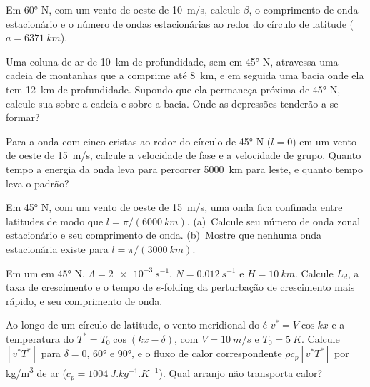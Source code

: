 \begin{exercise}[$\star$]\label{exo:b3:atmospheric-dynamics:4}
Em \ang{60} N, com um vento de oeste de \qty{10}{m/s}, calcule $\beta$, o
comprimento de onda estacionário e o número de ondas estacionárias ao redor do
círculo de latitude ($a = \qty{6371}{km}$).
\end{exercise}

\begin{exercise}[$\star\star$]\label{exo:b3:atmospheric-dynamics:5}
Uma coluna de ar de \qty{10}{km} de profundidade, sem  em \ang{45}
N, atravessa uma cadeia de montanhas que a comprime até \qty{8}{km}, e em seguida uma bacia
onde ela tem \qty{12}{km} de profundidade. Supondo que ela permaneça próxima de \ang{45} N, calcule sua
 sobre a cadeia e sobre a bacia. Onde
as depressões tenderão a se formar?
\end{exercise}

\begin{exercise}[$\star\star$]\label{exo:b3:atmospheric-dynamics:6}
Para a onda com cinco cristas ao redor do círculo de \ang{45} N ($l = 0$) em um
vento de oeste de \qty{15}{m/s}, calcule a velocidade de fase e a velocidade de grupo.
Quanto tempo a energia da onda leva para percorrer \qty{5000}{km} para leste, e quanto
tempo leva o padrão?
\end{exercise}

\begin{exercise}[$\star\star$]\label{exo:b3:atmospheric-dynamics:7}
Em \ang{45} N, com um vento de oeste de \qty{15}{m/s}, uma onda fica confinada entre
latitudes de modo que $l = \pi/(\qty{6000}{km})$. (a)~Calcule seu número de onda zonal estacionário e seu
comprimento de onda. (b)~Mostre que nenhuma onda estacionária existe para
$l = \pi/(\qty{3000}{km})$.
\end{exercise}

\begin{exercise}[$\star\star$]\label{exo:b3:atmospheric-dynamics:8}
Em um  em \ang{45} N, $\Lambda = \qty{2e-3}{s^{-1}}$, $N =
\qty{0.012}{s^{-1}}$ e $H = \qty{10}{km}$. Calcule $L_d$, a taxa de crescimento
e o tempo de $e$-folding da perturbação de crescimento mais rápido, e seu
comprimento de onda.
\end{exercise}

\begin{exercise}[$\star\star$]\label{exo:b3:atmospheric-dynamics:9}
Ao longo de um círculo de latitude, o vento meridional do  é $v^* = V\cos kx$ e a
temperatura do  $T^* = T_0\cos(kx - \delta)$, com $V = \qty{10}{m/s}$ e
$T_0 = \qty{5}{K}$. Calcule $[v^*T^*]$ para $\delta = 0$, \ang{60} e
\ang{90}, e o fluxo de calor correspondente $\rho c_p[v^*T^*]$ por
\unit{kg/m^3} de ar ($c_p = \qty{1004}{J.kg^{-1}.K^{-1}}$). Qual
arranjo não transporta calor?
\end{exercise}

